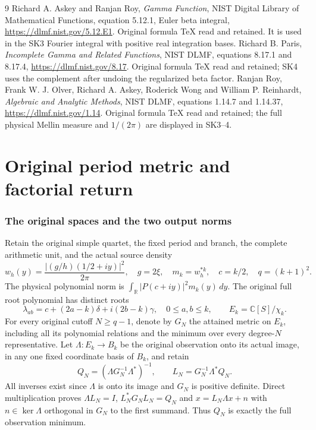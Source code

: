 \documentclass[11pt]{article}
\begin{document}
\begin{thebibliography}{9}
 Richard A. Askey and Ranjan Roy,
\emph{Gamma Function}, NIST Digital Library of Mathematical Functions,
equation 5.12.1, Euler beta integral, \url{https://dlmf.nist.gov/5.12.E1}.
Original formula TeX read and retained. It is used in the SK3 Fourier
integral with positive real integration bases.
 Richard B. Paris, \emph{Incomplete Gamma and Related
Functions}, NIST DLMF, equations 8.17.1 and 8.17.4,
\url{https://dlmf.nist.gov/8.17}. Original formula TeX read and retained;
SK4 uses the complement after undoing the regularized beta factor.
 Ranjan Roy, Frank W. J. Olver, Richard A. Askey,
Roderick Wong and William P. Reinhardt, \emph{Algebraic and Analytic
Methods}, NIST DLMF, equations 1.14.7 and 1.14.37,
\url{https://dlmf.nist.gov/1.14}. Original formula TeX read and retained;
the full physical Mellin measure and $1/(2\pi)$ are displayed in SK3--4.
\end{thebibliography}


\endgroup

\clearpage\begingroup
\part*{Original period metric and factorial return}
\newcommand{\pperiodC}{\mathbb C}
\newcommand{\pperiodR}{\mathbb R}
\newcommand{\pperiodim}{\operatorname{im}}
\newcommand{\pperioddiag}{\operatorname{diag}}



\section{The original spaces and the two output norms}
Retain the original simple quartet, the fixed period and branch, the
complete arithmetic unit, and the actual source density
\[
 w_h(y)=\frac{|(g/h)(1/2+iy)|^2}{2\pi},\quad g=2\xi,
 \quad m_k=w_h^{*k},\quad c=k/2,\quad q=(k+1)^2.                  \tag{PM1}
\]
The physical polynomial norm is
$\int_\pperiodR|P(c+iy)|^2m_k(y)\,dy$.  The original full root polynomial
has distinct roots
\[
 \lambda_{ab}=c+(2a-k)\delta+i(2b-k)\gamma,
 \quad0\le a,b\le k,
 \qquad E_k=\pperiodC[S]/\chi_k.                                      \tag{PM2}
\]
For every original cutoff $N\ge q-1$, denote by $G_N$ the attained
metric on $E_k$, including all its polynomial relations and the
minimum over every degree-$N$ representative.  Let
$\Lambda:E_k\to B_k$ be the original observation onto its actual
image, in any one fixed coordinate basis of $B_k$, and retain
\[
 Q_N=(\Lambda G_N^{-1}\Lambda^*)^{-1},\qquad
 L_N=G_N^{-1}\Lambda^*Q_N.                                     \tag{PM3}
\]
All inverses exist since $\Lambda$ is onto its image and $G_N$
is positive definite.  Direct multiplication proves
$\Lambda L_N=I$, $L_N^*G_NL_N=Q_N$ and
$x=L_N\Lambda x+n$ with $n\in\ker\Lambda$ orthogonal in $G_N$
to the first summand.  Thus $Q_N$ is exactly the full observation
minimum.
\end{document}
